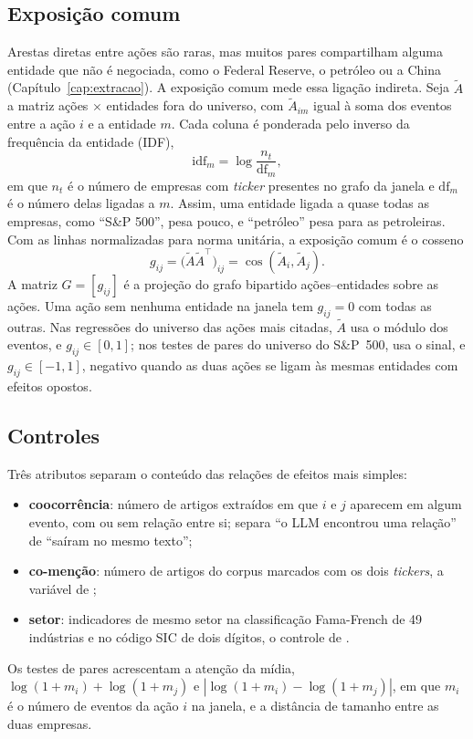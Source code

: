 \subsection{Exposição comum}

Arestas diretas entre ações são raras, mas muitos pares compartilham alguma entidade que não é
negociada, como o Federal Reserve, o petróleo ou a China (Capítulo~\ref{cap:extracao}). A exposição
comum mede essa ligação indireta. Seja $\tilde A$ a matriz ações $\times$ entidades fora do universo, com
$\tilde A_{im}$ igual à soma dos eventos entre a ação $i$ e a entidade $m$. Cada coluna é ponderada pelo
inverso da frequência da entidade (IDF),
\[
  \mathrm{idf}_m=\log\frac{n_t}{\mathrm{df}_m},
\]
em que $n_t$ é o número de empresas com \emph{ticker} presentes no grafo da janela e $\mathrm{df}_m$ é o
número delas ligadas a $m$. Assim, uma entidade ligada a quase todas as empresas, como ``S\&P 500'',
pesa pouco, e ``petróleo'' pesa para as petroleiras. Com as linhas normalizadas para norma unitária, a
exposição comum é o cosseno
\begin{equation}
  g_{ij} = \bigl(\tilde A\tilde A^\top\bigr)_{ij} = \cos(\tilde A_i,\tilde A_j).
  \label{eq:exposicao}
\end{equation}
A matriz $G=[g_{ij}]$ é a projeção do grafo bipartido ações--entidades sobre as ações. Uma ação sem
nenhuma entidade na janela tem $g_{ij}=0$ com todas as outras. Nas regressões do universo das ações mais
citadas, $\tilde A$ usa o módulo dos eventos, e $g_{ij}\in[0,1]$; nos testes de pares do universo do
S\&P~500, usa o sinal, e $g_{ij}\in[-1,1]$, negativo quando as duas ações se ligam às mesmas entidades com
efeitos opostos.

\subsection{Controles}

Três atributos separam o conteúdo das relações de efeitos mais simples:
\begin{itemize}
  \item \textbf{coocorrência}: número de artigos extraídos em que $i$ e $j$ aparecem em algum evento,
        com ou sem relação entre si; separa ``o LLM encontrou uma relação'' de ``saíram no mesmo
        texto'';
  \item \textbf{co-menção}: número de artigos do corpus marcados com os dois \emph{tickers}, a variável
        de \citet{tang2019};
  \item \textbf{setor}: indicadores de mesmo setor na classificação Fama-French de 49 indústrias e no
        código SIC de dois dígitos, o controle de \citet{elton1973}.
\end{itemize}
Os testes de pares acrescentam a atenção da mídia, $\log(1+m_i)+\log(1+m_j)$ e
$|\log(1+m_i)-\log(1+m_j)|$, em que $m_i$ é o número de eventos da ação $i$ na janela, e a distância de
tamanho entre as duas empresas.

